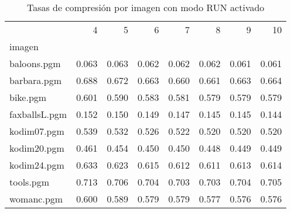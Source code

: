 \begin{table}[h!]
\centering
\caption{Tasas de compresión por imagen con modo RUN activado}
\label{tab:run}
\begin{tabular}{lrrrrrrr}
 & 4 & 5 & 6 & 7 & 8 & 9 & 10 \\
imagen &  &  &  &  &  &  &  \\
baloons.pgm & 0.063 & 0.063 & 0.062 & 0.062 & 0.062 & 0.061 & 0.061 \\
barbara.pgm & 0.688 & 0.672 & 0.663 & 0.660 & 0.661 & 0.663 & 0.664 \\
bike.pgm & 0.601 & 0.590 & 0.583 & 0.581 & 0.579 & 0.579 & 0.579 \\
faxballsL.pgm & 0.152 & 0.150 & 0.149 & 0.147 & 0.145 & 0.145 & 0.144 \\
kodim07.pgm & 0.539 & 0.532 & 0.526 & 0.522 & 0.520 & 0.520 & 0.520 \\
kodim20.pgm & 0.461 & 0.454 & 0.450 & 0.450 & 0.448 & 0.449 & 0.449 \\
kodim24.pgm & 0.633 & 0.623 & 0.615 & 0.612 & 0.611 & 0.613 & 0.614 \\
tools.pgm & 0.713 & 0.706 & 0.704 & 0.703 & 0.703 & 0.704 & 0.705 \\
womanc.pgm & 0.600 & 0.589 & 0.579 & 0.579 & 0.577 & 0.576 & 0.576 \\
\end{tabular}
\end{table}
